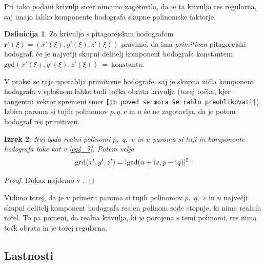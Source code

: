 \documentclass[12pt,a4paper,twoside]{article}
\newcommand{\iu}{\mathrm{i}\mkern1mu} %
\theoremstyle{definition} %
\newtheorem{definicija}{Definicija}[section]
\theoremstyle{plain} %
\newtheorem{izrek}[definicija]{Izrek}
\numberwithin{equation}{section}  %
\begin{document}
Pri tako podani krivulji sicer nimamo zagotovila, da je ta krivulja res regularna, saj imajo lahko komponente hodografa skupne polinomske faktorje.

\begin{definicija}
	Za krivuljo s pitagorejskim hodografom $\mathbf{r'}(\xi)=(x'(\xi),y'(\xi),z'(\xi))$ pravimo, da ima \emph{primitiven} pitagorejski hodograf, če je največji skupni delitelj komponent hodografa konstanten: $\mathrm{gcd}(x'(\xi),y'(\xi),z'(\xi))~=~\mathrm{konstanta}.$
\end{definicija}

V praksi se raje uporablja primitivne hodografe, saj je skupna ničla komponent hodografa v splošnem lahko tudi točka obrata krivulja (torej točka, kjer tangentni vektor spremeni smer \texttt{[to poved se mora še rahlo preoblikovati]}). Izbira paroma si tujih polinomov $p,q,v$ in $u$ še ne zagotavlja, da je potem hodograf res primitiven. 

\begin{izrek}
	Naj bodo realni polinomi $p,$ $q,$ $v$ in $u$ paroma si tuji in komponente hodografa take kot v \eqref{eq4_7}. Potem velja
	\begin{equation}
		\mathrm{gcd}(x',y',z')=|\mathrm{gcd}(u+\iu v,p-\iu q)|^2.
	\end{equation}
\end{izrek}
\begin{proof}
	Dokaz najdemo v \cite{faroukietal2004}.
\end{proof}

Vidimo torej, da je v primeru paroma si tujih polinomov $p,$ $q,$ $v$ in $u$ največji skupni delitelj komponent hodografa realen polinom sode stopnje, ki nima realnih ničel. To pa pomeni, da realna krivulja, ki je porojena s temi polinomi, res nima točk obrata in je torej regularna.

\subsection{Lastnosti}
\end{document}
